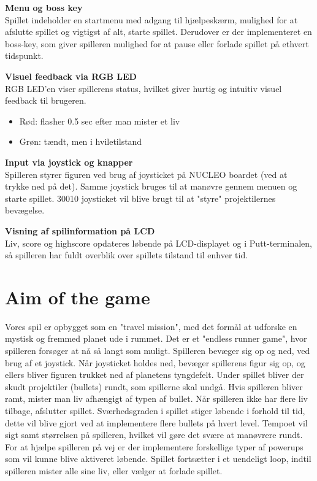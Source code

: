 \textbf{Menu og boss key}
\\Spillet indeholder en startmenu med adgang til hjælpeskærm, mulighed for at afslutte spillet og vigtigst af alt, starte spillet. Derudover er der implementeret en boss-key, som giver spilleren mulighed for at pause eller forlade spillet på ethvert tidspunkt.

\textbf{Visuel feedback via RGB LED}
\\RGB LED’en viser spillerens status, hvilket giver hurtig og intuitiv visuel feedback til brugeren. 
\vspace{-0.5em}
\begin{itemize}
    \setlength{\itemsep}{0pt}
    \setlength{\parskip}{1pt}
    \setlength{\parsep}{0pt}
    \item Rød: flasher 0.5 sec efter man mister et liv
    \item Grøn: tændt, men i hviletilstand
\end{itemize}

\textbf{Input via joystick og knapper}
\\Spilleren styrer figuren ved brug af joysticket på NUCLEO boardet (ved at trykke ned på det). Samme joystick bruges til at manøvre gennem menuen og starte spillet. 30010 joysticket vil blive brugt til at "styre" projektilernes bevægelse.

\textbf{Visning af spilinformation på LCD}
\\Liv, score og highscore opdateres løbende på LCD-displayet og i Putt-terminalen, så spilleren har fuldt overblik over spillets tilstand til enhver tid.

\vspace{5em}

\section{Aim of the game} \label{chap:ProduktUdvikling_sec:VoresSpil}
\vspace{0.5em}

Vores spil er opbygget som en "travel mission", med det formål at udforske en mystisk og fremmed planet ude i rummet. Det er et "endless runner game", hvor spilleren forsøger at nå så langt som muligt.
Spilleren bevæger sig op og ned, ved brug af et joystick. Når joysticket holdes ned, bevæger spillerens figur sig op, og ellers bliver figuren trukket ned af planetens tyngdefelt. 
Under spillet bliver der skudt projektiler (bullets) rundt, som spillerne skal undgå. Hvis spilleren bliver ramt, mister man liv afhængigt af typen af bullet. Når spilleren ikke har flere liv tilbage, afslutter spillet. 
Sværhedsgraden i spillet stiger løbende i forhold til tid, dette vil blive gjort ved at implementere flere bullets på hvert level. Tempoet vil sigt samt størrelsen på spilleren, hvilket vil gøre det svære at manøvrere rundt.
For at hjælpe spilleren på vej er der implementere forskellige typer af powerups som vil kunne blive aktiveret løbende.
Spillet fortsætter i et uendeligt loop, indtil spilleren mister alle sine liv, eller vælger at forlade spillet.

